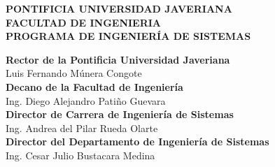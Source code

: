 \begin{center}

        \large
        \textbf{PONTIFICIA UNIVERSIDAD JAVERIANA} \\
        \textbf{FACULTAD DE INGENIERIA} \\
        \textbf{PROGRAMA DE INGENIERÍA DE SISTEMAS} \\

        
        \vspace{0.5cm}
        \LARGE


        \vspace{8cm}

        \large
        \textbf{Rector de la Pontificia Universidad Javeriana}\\
        \vspace{0.5cm}
        Luis Fernando Múnera Congote \\
        \vspace{0.5cm}
        \textbf{Decano de la Facultad de Ingeniería}\\
        \vspace{0.5cm}
        Ing. Diego Alejandro Patiño Guevara \\
        \vspace{0.5cm}
        \textbf{Director de Carrera de Ingeniería de Sistemas}\\
        \vspace{0.5cm}
        Ing. Andrea del Pilar Rueda Olarte \\
        \vspace{0.5cm}
        \textbf{Director del Departamento de Ingeniería de Sistemas}\\
        \vspace{0.5cm}
        Ing. Cesar Julio Bustacara Medina \\
        
    \end{center}